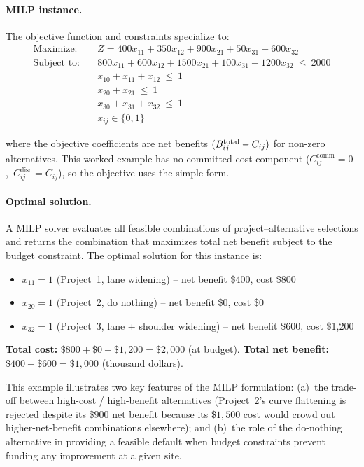 \paragraph{MILP instance.} The objective function and constraints
specialize to:
\begin{equation*}
\begin{aligned}
\text{Maximize:}\quad & Z = 400 x_{11} + 350 x_{12} + 900 x_{21} + 50 x_{31} + 600 x_{32} \\[4pt]
\text{Subject to:}\quad & 800 x_{11} + 600 x_{12} + 1500 x_{21} + 100 x_{31} + 1200 x_{32}\ \leq\ 2000 \\
& x_{10} + x_{11} + x_{12}\ \leq\ 1 \\
& x_{20} + x_{21}\ \leq\ 1 \\
& x_{30} + x_{31} + x_{32}\ \leq\ 1 \\
& x_{ij} \in \{0, 1\}
\end{aligned}
\end{equation*}

\noindent where the objective coefficients are net benefits
$(B^{\mathrm{total}}_{ij} - C_{ij})$ for non-zero alternatives. This worked example
has no committed cost component
($C_{ij}^{\mathrm{comm}} = 0$,\ $C_{ij}^{\mathrm{disc}} = C_{ij}$), so
the objective uses the simple form.

\paragraph{Optimal solution.} A MILP solver evaluates all feasible
combinations of project--alternative selections and returns the
combination that maximizes total net benefit subject to the budget
constraint. The optimal solution for this instance is:
\begin{itemize}[leftmargin=2em, itemsep=2pt]
  \item $x_{11} = 1$ (Project~1, lane widening) -- net benefit \$400, cost \$800
  \item $x_{20} = 1$ (Project~2, do nothing) -- net benefit \$0, cost \$0
  \item $x_{32} = 1$ (Project~3, lane + shoulder widening) -- net benefit \$600, cost \$1{,}200
\end{itemize}

\noindent \textbf{Total cost:} $\$800 + \$0 + \$1{,}200 = \$2{,}000$
(at budget). \textbf{Total net benefit:} $\$400 + \$600 = \$1{,}000$
(thousand dollars).

This example illustrates two key features of the MILP formulation:
(a)~the trade-off between high-cost / high-benefit alternatives
(Project~2's curve flattening is rejected despite its $\$900$ net benefit
because its $\$1{,}500$ cost would crowd out higher-net-benefit
combinations elsewhere); and (b)~the role of the do-nothing alternative
in providing a feasible default when budget constraints prevent funding
any improvement at a given site.

